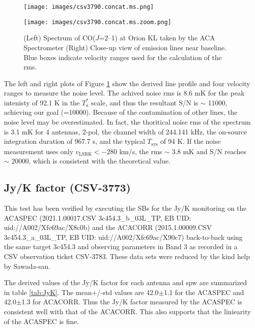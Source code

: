 \begin{figure}[htbp]
  \begin{minipage}[b]{0.48\linewidth}
    \centering
    \texttt{[image: images/csv3790.concat.ms.png]}
  \end{minipage}
  \begin{minipage}[b]{0.48\linewidth}
    \centering
    \texttt{[image: images/csv3790.concat.ms.zoom.png]}
  \end{minipage}
    \caption{(Left) Spectrum of CO($J$=2--1) at Orion KL taken by the ACA Spectrometer (Right) Close-up view of emission lines near baseline. Blue boxes indicate velocity ranges used for the calculation of the rms.}
    \label{fig:spectralDynamicRange}
\end{figure}


The left and right plots of Figure \ref{fig:spectralDynamicRange} show the derived line profile and four velocity ranges to measure the noise level. The achived noise rms is 8.6 mK for the peak intenisty of 92.1 K in the $T_a^*$ scale, and thus the resultant S/N is $\sim$ 11000, achieving our goal (=10000). Because of the contamination of other lines, the noise level may be overestimated. In fact, the thoritical noise rms of the spectrum is 3.1 mK for 4 antennas, 2-pol, the channel width of 244.141 kHz, the on-source integration duration of 967.7 s, and the typical $T_{\mathrm{sys}}$ of 94 K.  If the noise measurement uses only $v_{\mathrm{LSRK}}<-280$ km/s, the rms $\sim$ 3.8 mK and S/N reaches $\sim$ 20000, which is consistent with the theoretical value. 

\subsection{Jy/K factor (CSV-3773)}\label{sec:Jy/K}
This test has been verified by executing the SBs for the Jy/K monitoring on the ACASPEC (2021.1.00017.CSV 3c454.3\_b\_03L\_TP, EB UID: uid://A002/Xfc69ac/X8c0b) and the ACACORR (2015.1.00009.CSV 3c454.3\_a\_03L\_TP, EB UID: uid://A002/Xfc69ac/X90c7) back-to-back using the same target 3c454.3 and observing parameters in Band 3 as recorded in a CSV observation ticket CSV-3783. These data sets were reduced by the kind help by Sawada-san. 

The derived values of the Jy/K factor for each antenna and spw are summarized in table \ref{tab:JyK}. The mean+/-std values are 42.0$\pm$1.1 for the ACASPEC and 42.0$\pm$1.3 for ACACORR. Thus the Jy/K factor measured by the ACASPEC is consistent well with that of the ACACORR.
This also supports that the liniearity of the ACASPEC is fine.
 
